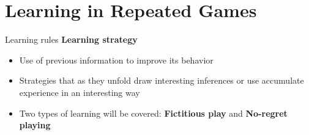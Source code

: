 
\section{Learning in Repeated Games}

\begin{frame}{Learning rules}
    \textbf{Learning strategy}
    \begin{itemize}
        \item Use of previous information to improve its behavior
        \item Strategies that as they unfold draw interesting inferences or use accumulate experience in an interesting way
        \item Two types of learning will be covered: \textbf{Fictitious play} and \textbf{No-regret playing}
    \end{itemize}
\end{frame}

